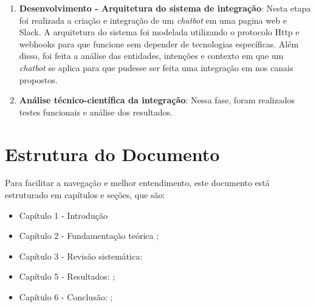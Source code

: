 \begin{enumerate}
    \item \textbf{Desenvolvimento -  Arquitetura do sistema de integração}: Nesta etapa foi realizada a criação e integração de um \textit{chatbot} em uma pagina web e Slack. A arquitetura do sistema foi modelada utilizando o protocolo Http e webhooks para que funcione sem depender de tecnologias específicas. Além disso, foi feita a análise das entidades, intenções e contexto em que um \textit{chatbot} se aplica para que pudesse ser feita uma integração em nos canais propostos. 
    
    \item \textbf{Análise técnico-científica da integração}: Nessa fase, foram realizados testes funcionais e análise dos resultados.
\end{enumerate}

\section{Estrutura do Documento}

Para facilitar a navegação e melhor entendimento, este documento está
estruturado em capítulos e seções, que são:
\begin{itemize}
\item {Capítulo 1 - Introdução}
\item {Capítulo 2 - Fundamentação teórica} \cite{Cormen:2009};
\item {Capítulo 3 - Revisão sistemática}: \cite{Weicker:1984:DSS:358274.358283}
\item {Capítulo 5 - Resultados}: \cite{Linux:402081};
\item {Capítulo 6 - Conclusão}: \cite{SBC:2012};
\end{itemize}
